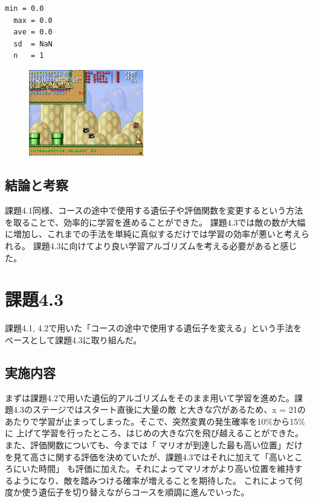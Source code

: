 \documentclass[a4paper,11pt]{jsarticle}
\begin{document}
{\begin{lstlisting}[caption=実行結果]
  min = 0.0
  max = 0.0
  ave = 0.0
  sd  = NaN
  n   = 1
\end{lstlisting}

\begin{figure}[h]
  \begin{center}
    \includegraphics*[width=50mm]{images/report4/reaching-goal2.png}
  \end{center}
\end{figure}

\subsection*{結論と考察}
課題4.1同様、コースの途中で使用する遺伝子や評価関数を変更するという方法を取ることで、効率的に学習を進めることができた。
課題4.3では敵の数が大幅に増加し、これまでの手法を単純に真似するだけでは学習の効率が悪いと考えられる。
課題4.3に向けてより良い学習アルゴリズムを考える必要があると感じた。

\section*{課題4.3}

課題4.1, 4.2で用いた「コースの途中で使用する遺伝子を変える」という手法をベースとして課題4.3に取り組んだ。

\subsection*{実施内容}

まずは課題4.2で用いた遺伝的アルゴリズムをそのまま用いて学習を進めた。課題4.3のステージではスタート直後に大量の敵
と大きな穴があるため、x = 21のあたりで学習が止まってしまった。そこで、突然変異の発生確率を10\%から15\%に
上げて学習を行ったところ、はじめの大きな穴を飛び越えることができた。また、評価関数についても、今までは「
マリオが到達した最も高い位置」だけを見て高さに関する評価を決めていたが、課題4.3ではそれに加えて「高いところにいた時間」
も評価に加えた。それによってマリオがより高い位置を維持するようになり、敵を踏みつける確率が増えることを期待した。
これによって何度か使う遺伝子を切り替えながらコースを順調に進んでいった。

}
\end{document}
